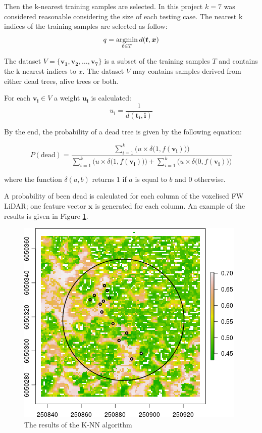 \documentclass{subfiles}
\begin{document}
\par Then the k-nearest training samples are selected. In this project $k=7$ was considered reasonable considering the size of each testing case. The nearest k indices of the training samples are selected as follow:
\begin{equation} 
q = \operatornamewithlimits{argmin}_{\boldsymbol{t} \in T} d(\boldsymbol{t},\boldsymbol{x})
\end{equation}
\par The dataset $V=\{\boldsymbol{v_1}, \boldsymbol{v_2},\dots, \boldsymbol{v_7}\} $ is a subset of the training samples $T$ and contains the k-nearest indices to $x$. The dataset $V$ may contains samples derived from either dead trees, alive trees or both. 


\par For each $\boldsymbol{v_i} \in V$ a weight $\boldsymbol{u_i}$ is calculated:
\begin{equation} 
u_i = \frac{1}{d(\boldsymbol{t_i}, \boldsymbol{i})}
\end{equation}

\par By the end, the probability of a dead tree is given by the following equation: 

\begin{equation} 
P(\textrm{dead}) =  \frac{\sum_{i=1}^{k}{ \Big(u \times \delta \big(1,f(\boldsymbol{v_i})\big)\Big)}}{ \sum_{i=1}^{k}{\Big(u \times \delta \big(1,f(\boldsymbol{v_i})\big)\Big)} + \sum_{i=1}^{k}{ \Big(u \times \delta \big(0,f(\boldsymbol{v_i})\big)\Big)}}
\end{equation}

where the function $\delta(a,b)$ returns $1$ if $a$ is equal to $b$ and $0$ otherwise. 

\par A probability of been dead is calculated for each column of the voxelised FW LiDAR; one feature vector $\boldsymbol{x}$ is generated for each column. An example of the results is given in Figure \ref{fig:c1_knn}. 

 				\begin{figure} [h!]			
 					\centering
 					\includegraphics[width=.49\textwidth]{img/dead/c1_knn}
 					\caption{The results of the K-NN algorithm} 
 					\label{fig:c1_knn}
 				\end{figure}
\end{document}
